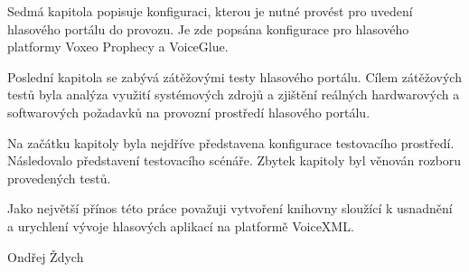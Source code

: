 \documentclass[ing,male,java,dept460,twoside]{diploma}						%
\begin{document}
Sedmá kapitola popisuje konfiguraci, kterou je nutné provést pro uvedení hlasového portálu do provozu. Je zde popsána konfigurace pro hlasového platformy Voxeo Prophecy a VoiceGlue.

Poslední kapitola se zabývá zátěžovými testy hlasového portálu. Cílem zátěžových testů byla analýza využití systémových zdrojů a zjištění reálných hardwarových a softwarových požadavků na provozní prostředí hlasového portálu.

Na začátku kapitoly byla nejdříve představena konfigurace testovacího prostředí. Následovalo představení testovacího scénáře. Zbytek kapitoly byl věnován rozboru provedených testů.

Jako největší přínos této práce považuji vytvoření knihovny sloužící k usnadnění a urychlení vývoje hlasových aplikací na platformě VoiceXML.

\bigskip
\begin{flushright}
Ondřej Ždych
\end{flushright}
\end{document}
